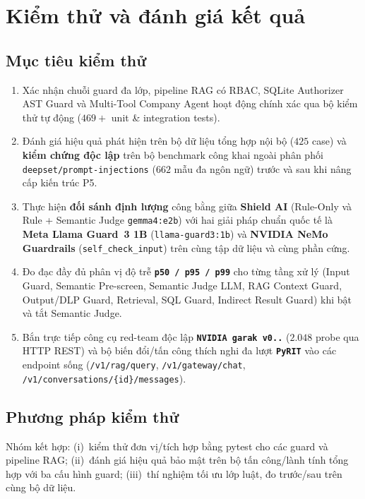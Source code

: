 \chapter{Kiểm thử và đánh giá kết quả}
\label{ch:kiem-thu}

\section{Mục tiêu kiểm thử}

\begin{enumerate}
    \item Xác nhận chuỗi guard đa lớp, pipeline RAG có RBAC, SQLite Authorizer AST Guard và Multi-Tool Company Agent hoạt động chính xác qua bộ kiểm thử tự động ($469+$ unit \& integration tests).
    \item Đánh giá hiệu quả phát hiện trên bộ dữ liệu tổng hợp nội bộ ($425$ case) và \textbf{kiểm chứng độc lập} trên bộ benchmark công khai ngoài phân phối \texttt{deepset/\allowbreak prompt-\allowbreak injections} ($662$ mẫu đa ngôn ngữ) trước và sau khi nâng cấp kiến trúc P5.
    \item Thực hiện \textbf{đối sánh định lượng} công bằng giữa \textbf{Shield AI} (Rule-Only và Rule + Semantic Judge \texttt{gemma4:e2b}) với hai giải pháp chuẩn quốc tế là \textbf{Meta Llama Guard~3 1B} (\texttt{llama-\allowbreak guard3:1b}) và \textbf{NVIDIA NeMo Guardrails} (\texttt{self\_\allowbreak check\_\allowbreak input}) trên cùng tập dữ liệu và cùng phần cứng.
    \item Đo đạc đầy đủ phân vị độ trễ \textbf{\texttt{p50 / p95 / p99}} cho từng tầng xử lý (Input Guard, Semantic Pre-screen, Semantic Judge LLM, RAG Context Guard, Output/DLP Guard, Retrieval, SQL Guard, Indirect Result Guard) khi bật và tắt Semantic Judge.
    \item Bắn trực tiếp công cụ red-team độc lập \textbf{\texttt{NVIDIA garak v0..}} ($2.048$ probe qua HTTP REST) và bộ biến đổi/tấn công thích nghi đa lượt \textbf{\texttt{PyRIT}} vào các endpoint sống (\texttt{/\allowbreak v1/\allowbreak rag/\allowbreak query}, \texttt{/\allowbreak v1/\allowbreak gateway/\allowbreak chat}, \texttt{/v1/conversations/\{id\}/messages}).
\end{enumerate}

\section{Phương pháp kiểm thử}

Nhóm kết hợp: (i)~kiểm thử đơn vị/tích hợp bằng pytest cho các guard và pipeline RAG; (ii)~đánh giá hiệu quả bảo mật trên bộ tấn công/lành tính tổng hợp với ba cấu hình guard; (iii)~thí nghiệm tối ưu lớp luật, đo trước/sau trên cùng bộ dữ liệu.

